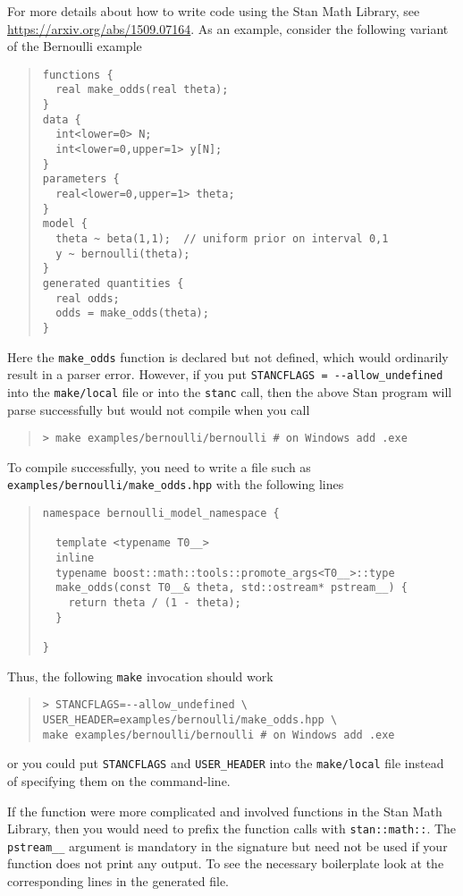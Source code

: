 For more details about how to write \Cpp code using the Stan Math
Library, see \url{https://arxiv.org/abs/1509.07164}. As an example,
consider the following variant of the Bernoulli example
%
\begin{quote}
\begin{Verbatim}
functions {
  real make_odds(real theta);
}
data {
  int<lower=0> N;
  int<lower=0,upper=1> y[N];
}
parameters {
  real<lower=0,upper=1> theta;
}
model {
  theta ~ beta(1,1);  // uniform prior on interval 0,1
  y ~ bernoulli(theta);
}
generated quantities {
  real odds;
  odds = make_odds(theta);
}
\end{Verbatim}
\end{quote}
%
Here the {\tt make\_odds} function is declared but not defined,
which would ordinarily result in a parser error. However, if you
put \Verb|STANCFLAGS = --allow_undefined| into the
{\tt make/local} file or into the {\tt stanc} call, then the above 
Stan program will parse successfully but would not compile when you 
call
%
\begin{quote}
\begin{Verbatim}[fontshape=sl]
> make examples/bernoulli/bernoulli # on Windows add .exe 
\end{Verbatim}
\end{quote}
%
To compile successfully, you need to write a file such as {\tt
examples/bernoulli/make\_odds.hpp} with the following lines
%
\begin{quote}
\begin{Verbatim}
namespace bernoulli_model_namespace {

  template <typename T0__>
  inline
  typename boost::math::tools::promote_args<T0__>::type
  make_odds(const T0__& theta, std::ostream* pstream__) {
    return theta / (1 - theta);
  }

}
\end{Verbatim}
\end{quote}
%
Thus, the following {\tt make} invocation should work
%
\begin{quote}
\begin{Verbatim}[fontshape=sl]
> STANCFLAGS=--allow_undefined \
USER_HEADER=examples/bernoulli/make_odds.hpp \
make examples/bernoulli/bernoulli # on Windows add .exe 
\end{Verbatim}
\end{quote}
%
or you could put \Verb|STANCFLAGS| and \Verb|USER_HEADER|
into the {\tt make/local} file instead of specifying them
on the command-line.

If the function were more complicated and involved functions
in the Stan Math Library, then you would need to prefix the
function calls with {\tt stan::math::}. The {\tt pstream\_\_}
argument is mandatory in the signature but need not be used
if your function does not print any output. To see the 
necessary boilerplate look at the corresponding lines in the
generated \Cpp file.
